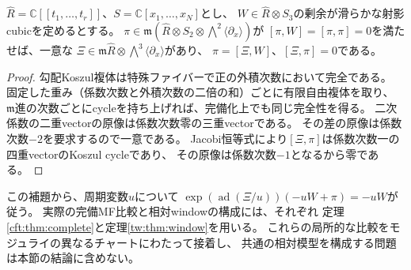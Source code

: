 \begin{lemma}[多変数でも成立する形式Poisson消去の代数部分]
\label{gcd:lem:multi-koszul}
$\widehat R=\mathbb C[[t_1,\ldots,t_r]]$、$S=\mathbb C[x_1,\ldots,x_N]$とし、
$W\in\widehat R\otimes S_3$の剰余が滑らかな射影cubicを定めるとする。
$\pi\in\mathfrak m(\widehat R\otimes S_2\otimes\bigwedge^2\langle\partial_x\rangle)$が
$[\pi,W]=[\pi,\pi]=0$を満たせば、一意な
$\Xi\in\mathfrak m\widehat R\otimes\bigwedge^3\langle\partial_x\rangle$があり、
$\pi=[\Xi,W]$、$[\Xi,\pi]=0$である。
\end{lemma}
\begin{proof}
勾配Koszul複体は特殊ファイバーで正の外積次数において完全である。
固定した重み（係数次数と外積次数の二倍の和）ごとに有限自由複体を取り、
$\mathfrak m$進の次数ごとにcycleを持ち上げれば、完備化上でも同じ完全性を得る。
二次係数の二重vectorの原像は係数次数零の三重vectorである。
その差の原像は係数次数$-2$を要求するので一意である。
Jacobi恒等式により$[\Xi,\pi]$は係数次数一の四重vectorのKoszul cycleであり、
その原像は係数次数$-1$となるから零である。
\end{proof}

この補題から、周期変数$u$について
$\exp(\operatorname{ad}(\Xi/u))(-uW+\pi)=-uW$が従う。
実際の完備MF比較と相対windowの構成には、それぞれ
定理\ref{cft:thm:complete}と定理\ref{tw:thm:window}を用いる。
これらの局所的な比較をモジュライの異なるチャートにわたって接着し、
共通の相対模型を構成する問題は本節の結論に含めない。
